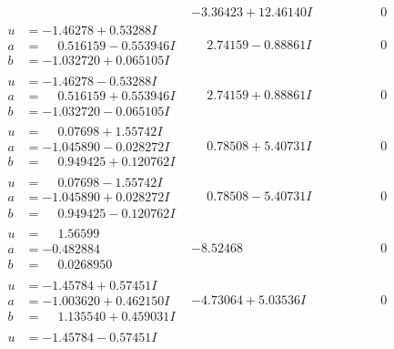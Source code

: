 \documentclass[1p]{elsarticle_modified}
\theoremstyle{definition}
\begin{document}
$$\begin{array}{c|c|c}
 & -3.36423 + 12.46140 I & \phantom{-0.000000 } 0 \\ \hline\begin{aligned}
u &= -1.46278 + 0.53288 I \\
a &= \phantom{-}0.516159 - 0.553946 I \\
b &= -1.032720 + 0.065105 I\end{aligned}
 & \phantom{-}2.74159 - 0.88861 I & \phantom{-0.000000 } 0 \\ \hline\begin{aligned}
u &= -1.46278 - 0.53288 I \\
a &= \phantom{-}0.516159 + 0.553946 I \\
b &= -1.032720 - 0.065105 I\end{aligned}
 & \phantom{-}2.74159 + 0.88861 I & \phantom{-0.000000 } 0 \\ \hline\begin{aligned}
u &= \phantom{-}0.07698 + 1.55742 I \\
a &= -1.045890 - 0.028272 I \\
b &= \phantom{-}0.949425 + 0.120762 I\end{aligned}
 & \phantom{-}0.78508 + 5.40731 I & \phantom{-0.000000 } 0 \\ \hline\begin{aligned}
u &= \phantom{-}0.07698 - 1.55742 I \\
a &= -1.045890 + 0.028272 I \\
b &= \phantom{-}0.949425 - 0.120762 I\end{aligned}
 & \phantom{-}0.78508 - 5.40731 I & \phantom{-0.000000 } 0 \\ \hline\begin{aligned}
u &= \phantom{-}1.56599\phantom{ +0.000000I} \\
a &= -0.482884\phantom{ +0.000000I} \\
b &= \phantom{-}0.0268950\phantom{ +0.000000I}\end{aligned}
 & -8.52468\phantom{ +0.000000I} & \phantom{-0.000000 } 0 \\ \hline\begin{aligned}
u &= -1.45784 + 0.57451 I \\
a &= -1.003620 + 0.462150 I \\
b &= \phantom{-}1.135540 + 0.459031 I\end{aligned}
 & -4.73064 + 5.03536 I & \phantom{-0.000000 } 0 \\ \hline\begin{aligned}
u &= -1.45784 - 0.57451 I \\

\end{aligned}
\end{array}$$
\end{document}
